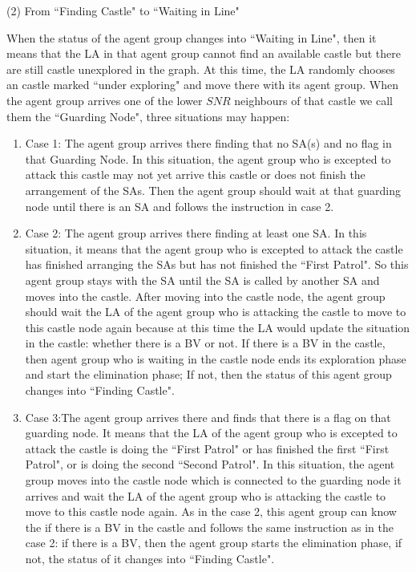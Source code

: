 (2) From ``Finding Castle" to ``Waiting in Line"

When the status of the agent group changes into ``Waiting in Line", then it means that the  LA in that agent group cannot find an available castle but there are still castle unexplored in the graph. At this time, the LA  randomly chooses an  castle marked ``under exploring" and move there with its agent group. When the agent group arrives one of the lower $SNR$ neighbours of that castle we call them the ``Guarding Node", three situations may happen:
\begin{enumerate}
\item Case 1: The agent group arrives there finding that no SA(s) and no flag in that  Guarding Node. In this situation, the agent group who is excepted to attack this castle may not yet arrive this castle or does not finish the arrangement of the SAs. Then the agent group should wait at that guarding node until there is an SA and follows the instruction in case 2.

\item Case 2: The agent group arrives there finding at least one SA. In this situation, it means that the agent group who is excepted to attack the castle has finished arranging the SAs but has not finished the ``First Patrol". So this agent group stays with the SA until the SA is called by another SA and moves into the castle. After moving into the castle node, the agent group should wait the LA of the agent group who is attacking the castle to move to this castle node again because at this time the LA would update the situation in the castle: whether there is a BV or not. If there is a BV in the castle, then agent group who is waiting in the castle node ends its exploration phase and start the elimination phase; If not, then the status of this agent group changes into ``Finding Castle".

\item Case 3:The agent group arrives there and finds that there is a flag on that guarding node. It means that the LA of the agent group who is excepted to attack the castle is doing the ``First Patrol" or has finished the first ``First Patrol", or is doing the second ``Second Patrol". In this situation, the agent group moves into the castle node which is connected to the guarding node it arrives and wait the LA of the agent group who is attacking the castle to move to this castle node again. As in the case 2, this agent group can know the if there is a BV in the castle and follows the same instruction as in the case 2: if there is a BV, then the agent group starts the elimination phase, if not, the status of it changes into ``Finding Castle".

\end{enumerate}


